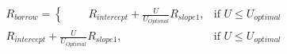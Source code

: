 \documentclass[preview]{standalone}
\begin{document}
\begin{align*}
R_{borrow} = \begin{cases} \\[6pt] & \text{ } \\ & \text{ } \end{cases} R_{intercept} +  \frac{U}{U_{Optimal}} R_{slope1}, & \text{if }  U \leq U_{optimal} \\R_{intercept} +  \frac{U}{U_{Optimal}} R_{slope1}, & \text{if }  U \leq U_{optimal}
\end{align*}
\end{document}

